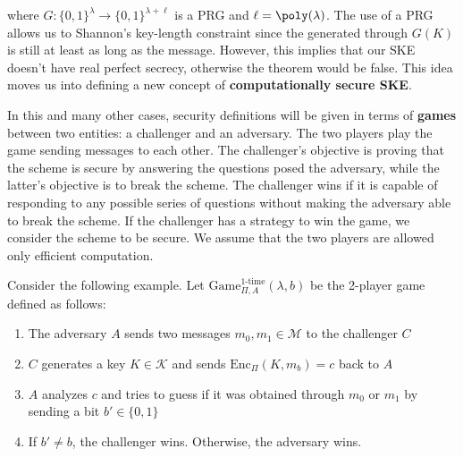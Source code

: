\documentclass[a4paper, 12pt]{report}
\begin{document}
    where $G : \{0,1\}^\lambda \to \{0,1\}^{\lambda+\ell}$ is a PRG and $\ell = \poly(\lambda)$. The use of a PRG allows us to  Shannon's key-length constraint since the  generated through $G(K)$ is still at least as long as the message. However, this implies that our SKE doesn't have real perfect secrecy, otherwise the theorem would be false. This idea moves us into defining a new concept of \textbf{computationally secure SKE}.
    
    In this and many other cases, security definitions will be given in terms of \textbf{games} between two entities: a challenger and an adversary. The two players play the game sending messages to each other. The challenger's objective is proving that the scheme is secure by answering the questions posed the adversary, while the latter's objective is to break the scheme. The challenger wins if it is capable of responding to any possible series of questions without making the adversary able to break the scheme. If the challenger has a strategy to win the game, we consider the scheme to be secure. We assume that the two players are allowed only efficient computation.

    Consider the following example. Let $\mathrm{Game}_{\Pi, A}^{\text{1-time}}(\lambda, b)$ be the 2-player game defined as follows:
    \begin{enumerate}
        \item The adversary $A$ sends two messages $m_0, m_1 \in \mathcal{M}$ to the challenger $C$
        \item $C$ generates a key $K \in \mathcal{K}$ and sends $\mathrm{Enc}_\Pi(K, m_b) = c$ back to $A$
        \item $A$ analyzes $c$ and tries to guess if it was obtained through $m_0$ or $m_1$ by sending a bit $b' \in \{0,1\}$
        \item If $b' \neq b$, the challenger wins. Otherwise, the adversary wins. 
    \end{enumerate}
\end{document}
